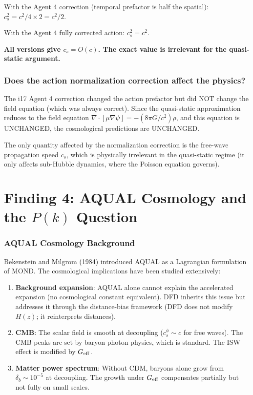\documentclass[11pt]{article}
\begin{document}
With the Agent 4 correction (temporal prefactor is half the spatial):
$c_s^2 = c^2/4 \times 2 = c^2/2$.

With the Agent 4 fully corrected action: $c_s^2 = c^2$.

\textbf{All versions give $c_s = O(c)$. The exact value is
irrelevant for the quasi-static argument.}

\section{Does the action normalization correction affect the physics?}

The i17 Agent 4 correction changed the action prefactor but did NOT
change the field equation (which was always correct). Since the
quasi-static approximation reduces to the field equation
$\nabla\cdot[\mu\nabla\psi] = -(8\pi G/c^2)\rho$, and this equation
is UNCHANGED, the cosmological predictions are UNCHANGED.

The only quantity affected by the normalization correction is the
free-wave propagation speed $c_s$, which is physically irrelevant in
the quasi-static regime (it only affects sub-Hubble dynamics, where
the Poisson equation governs).


\part{Finding 4: AQUAL Cosmology and the $P(k)$ Question}
\label{part:aqual}

\section{AQUAL Cosmology Background}

Bekenstein and Milgrom (1984) introduced AQUAL as a Lagrangian formulation
of MOND. The cosmological implications have been studied extensively:

\begin{enumerate}[nosep]
\item \textbf{Background expansion}: AQUAL alone cannot explain the
  accelerated expansion (no cosmological constant equivalent). DFD
  inherits this issue but addresses it through the distance-bias
  framework (DFD does not modify $H(z)$; it reinterprets distances).
\item \textbf{CMB}: The scalar field is smooth at decoupling ($c_s^{\phi}
  \sim c$ for free waves). The CMB peaks are set by baryon-photon
  physics, which is standard. The ISW effect is modified by $G_{\rm eff}$.
\item \textbf{Matter power spectrum}: Without CDM, baryons alone grow
  from $\delta_b \sim 10^{-5}$ at decoupling. The growth under
  $G_{\rm eff}$ compensates partially but not fully on small scales.
\end{enumerate}
\end{document}
